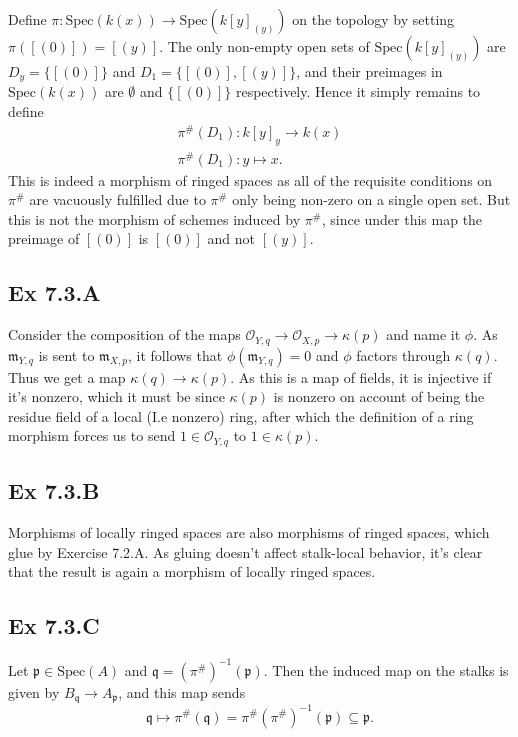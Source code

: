 \documentclass{article}
\theoremstyle{definition}
\newcommand{\Spec}{\text{Spec}}
\begin{document}
Define $\pi : \Spec(k(x)) \to \Spec(k[y]_{(y)})$ on the topology by setting
$\pi([(0)]) = [(y)]$. The only non-empty open sets of $\Spec(k[y]_{(y)})$ are
$D_y = \{[(0)]\}$ and $D_1 = \{[(0)], [(y)]\}$, and their preimages in
$\Spec(k(x))$ are $\emptyset$ and $\{[(0)]\}$ respectively. Hence it simply
remains to define
\begin{align*}
	\pi^{\#}(D_1) : k[y]_{y} \to k(x) \\
	\pi^{\#}(D_1) : y \mapsto x.
\end{align*}
This is indeed a morphism of ringed spaces as all of the requisite conditions
on $\pi^{\#}$ are vacuously fulfilled due to $\pi^{\#}$ only being non-zero on
a single open set. But this is not the morphism of schemes induced by
$\pi^{\#}$, since under this map the preimage of $[(0)]$ is $[(0)]$ and not
$[(y)]$.

\subsection*{Ex 7.3.A}

Consider the composition of the maps $\mathcal{O}_{Y, q} \to \mathcal{O}_{X, p}
	\to \kappa(p)$ and name it $\phi$. As $\mathfrak{m}_{Y, q}$ is sent to
$\mathfrak{m}_{X, p}$, it follows that $\phi(\mathfrak{m}_{Y, q}) = 0$ and
$\phi$ factors through $\kappa(q)$. Thus we get a map $\kappa(q) \to
	\kappa(p)$. As this is a map of fields, it is injective if it's nonzero, which
it must be since $\kappa(p)$ is nonzero on account of being the residue field
of a local (I.e nonzero) ring, after which the definition of a ring morphism
forces us to send $1 \in \mathcal{O}_{Y, q}$ to $1 \in \kappa(p)$.

\subsection*{Ex 7.3.B}

Morphisms of locally ringed spaces are also morphisms of ringed spaces, which
glue by Exercise 7.2.A. As gluing doesn't affect stalk-local behavior, it's
clear that the result is again a morphism of locally ringed spaces.

\subsection*{Ex 7.3.C}

Let $\mathfrak{p} \in \Spec(A)$ and $\mathfrak{q} =
	(\pi^{\#})^{-1}(\mathfrak{p})$. Then the induced map on the stalks is given by
$B_{\mathfrak{q}} \to A_{\mathfrak{p}}$, and this map sends
\[
	\mathfrak{q} \mapsto \pi^{\#}(\mathfrak{q})
	=
	\pi^{\#}(\pi^{\#})^{-1}(\mathfrak{p})
	\subseteq
	\mathfrak{p}.
\]
\end{document}
